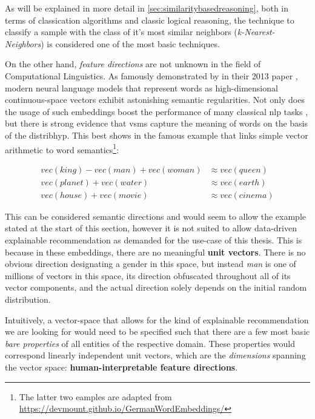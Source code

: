 As will be explained in more detail in \autoref{sec:similaritybasedreasoning}, both in terms of classication algorithms and classic logical reasoning, the technique to classify a sample with the class of it's most similar neighbors (\emph{k-Nearest-Neighbors}) is considered one of the most basic techniques.

On the other hand, \textit{feature directions} are not unknown in the field of Computational Linguistics. As famously demonstrated by \textcite{Mikolov:Regularities} in their 2013 paper , modern neural language models that represent words as high-dimensional continuous-space vectors exhibit astonishing semantic regularities. Not only does the usage of such embeddings boost the performance of many classical \gls{nlp} tasks \cite{Mikolov2013a,Le2014, Devlin2019}, but there is strong evidence that \glspl{vsm} capture the meaning of words on the basis of the \gls{distribhyp}. This best shows in the famous example that links simple vector arithmetic to word semantics\footnote{The latter two eamples are adapted from \url{https://devmount.github.io/GermanWordEmbeddings/}}:

\setlength{\belowdisplayskip}{3pt}
\vspace{-6.5ex}
\begin{align}
	vec(king) - vec(man) + vec(woman) &\approx vec(queen) \nonumber \\ 
	vec(planet) + vec(water) &\approx vec(earth)  \label{eq:w2vregularity}\\
	vec(house) + vec(movie) &\approx vec(cinema) \nonumber
\end{align}

This can be considered semantic directions and would seem to allow the example stated at the start of this section, however it is not suited to allow data-driven explainable recommendation as demanded for the use-case of this thesis. This is because in these embeddings, there are no meaningful \textbf{unit vectors}. There is no obvious direction designating a gender in this space, but instead \textit{man} is one of millions of vectors in this space, its direction obfuscated throughout all of its vector components, and the actual direction solely depends on the initial random distribution. 

Intuitively, a vector-space that allows for the kind of explainable recommendation we are looking for would need to be specified such that there are a few most basic \textit{bare properties} of all entities of the respective domain. These properties would correspond linearly independent unit vectors, which are the \textit{dimensions} spanning the vector space: \textbf{human-interpretable feature directions}.

